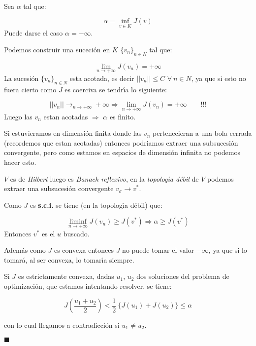 \begin{demosteorema}
\ \newline

Sea $\alpha$ tal que:

\begin{displaymath}
\alpha = \inf_{v \in K} J(v)
\end{displaymath}
Puede darse el caso $\alpha=- \infty$.\newline

Podemos construir una suceci\'on en $K$ $\{ v_n \}_{n \in N}$ tal que:

\begin{displaymath}
\lim_{n \to +\infty} J(v_n) = +\infty
\end{displaymath}
La sucesi\'on $\{ v_n\}_{n \in N}$ esta acotada, es decir $||v_n || \le C$ 
$\forall \ n \in N$, ya que si esto no fuera cierto como $J$ es coerciva se
tendr\'{\i}a lo siguiente:

\begin{displaymath}
||v_n|| \mathop{\longrightarrow}_{n \to +\infty} +\infty \Longrightarrow
\lim_{n \to +\infty} J(v_n) = +\infty \qquad !!!
\end{displaymath}
Luego las $v_n$ estan acotadas $\Longrightarrow$ $\alpha$ es finito.\newline

Si estuvieramos en dimensi\'on finita donde las $v_n$ pertenecieran a una
bola cerrada (recordemos que estan acotadas) entonces podriamos extraer una
subsucesi\'on convergente, pero como estamos en espacios de dimensi\'on
infinita no podemos hacer esto.\newline

$V$ es de \emph{Hilbert} luego es \emph{Banach reflexivo}, en la
\emph{topolog\'{\i}a d\'ebil} de $V$ podemos extraer una subsucesi\'on
convergente $v_{\sigma}\longrightarrow v^{*}$.\newline

Como $J$ es \textbf{s.c.i.} se tiene (en la topolog\'{\i}a d\'ebil) que:

\begin{displaymath}
\liminf_{n \to +\infty} J(v_n) \ge J(v^{*}) \Longrightarrow \alpha \ge J(v^{*})
\end{displaymath}
Entonces $v^{*}$ es el $u$ buscado.\newline

Adem\'as como $J$ es convexa entonces $J$ no puede tomar el valor $-\infty$,
ya que si lo tomar\'a, al ser convexa, lo tomar\'{\i}a siempre.\newline

Si $J$ es estrictamente convexa, dadas $u_1$, $u_2$ dos soluciones del problema
de optimizaci\'on, que estamos intentando resolver, se tiene:

\begin{displaymath}
J(\frac{u_1 +u_2}{2})< \frac{1}{2}\ \{ J(u_1)+ J(u_2)\} \le \alpha
\end{displaymath}

con lo cual llegamos a contradicci\'on si $u_1 \neq u_2$.
\begin{flushright}
$\blacksquare$
\end{flushright}

\end{demosteorema}

